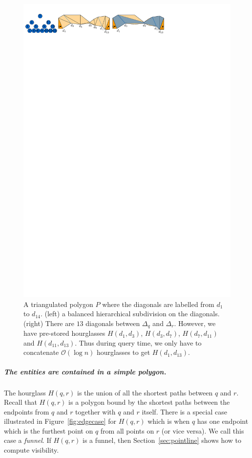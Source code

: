 \documentclass[UKenglish]{lipics-v2019}
\begin{document}
\begin{figure}[h]
    \centering
    \includegraphics[]{../guibas}
    \caption{A triangulated polygon $P$ where the diagonals are labelled from $d_1$ to $d_{14}$. (left) a balanced hierarchical subdivision on the diagonals. (right) There are $13$ diagonals between $\Delta_q$ and $\Delta_r$. However, we have pre-stored hourglasses $H(d_1,d_3)$, $H(d_3, d_7)$, $H(d_7, d_{11})$ and $H(d_{11}, d_{13})$. Thus during query time, we only have to concatenate $\mathcal{O}(\log n)$ hourglasses to get $H(d_1, d_{13})$. }
    \label{fig:guibas}
\end{figure}

\subparagraph{The entities are contained in a simple polygon.}
The hourglass $H(q, r)$ is the union of all the shortest paths between $q$ and $r$. 
Recall that $H(q,r)$ is a polygon bound by the shortest paths between the endpoints from $q$ and $r$ together with $q$ and $r$ itself. There is a special case illustrated in Figure~\ref{fig:edgecase} for $H(q,r)$ which is when $q$ has one endpoint which is the furthest point on $q$ from all points on $r$ (or vice versa). We call this case a \emph{funnel}. If $H(q,r)$ is a funnel, then Section~\ref{sec:pointline} shows how to compute visibility.
\end{document}
